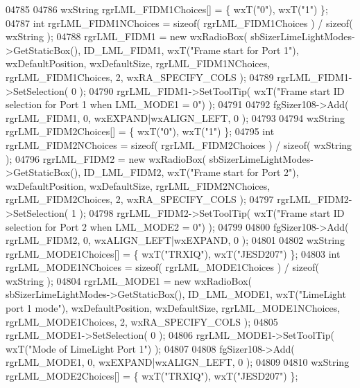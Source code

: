 \begin{DoxyCode}
04785     
04786     wxString rgrLML\_FIDM1Choices[] = \{ wxT(\textcolor{stringliteral}{"0"}), wxT(\textcolor{stringliteral}{"1"}) \};
04787     \textcolor{keywordtype}{int} rgrLML\_FIDM1NChoices = \textcolor{keyword}{sizeof}( rgrLML\_FIDM1Choices ) / \textcolor{keyword}{sizeof}( wxString );
04788     rgrLML_FIDM1 = \textcolor{keyword}{new} wxRadioBox( sbSizerLimeLightModes->GetStaticBox(), 
      ID_LML_FIDM1, wxT(\textcolor{stringliteral}{"Frame start for Port 1"}), wxDefaultPosition, wxDefaultSize, rgrLML\_FIDM1NChoices, 
      rgrLML\_FIDM1Choices, 2, wxRA\_SPECIFY\_COLS );
04789     rgrLML_FIDM1->SetSelection( 0 );
04790     rgrLML_FIDM1->SetToolTip( wxT(\textcolor{stringliteral}{"Frame start ID selection for Port 1 when LML\_MODE1 = 0"}) );
04791     
04792     fgSizer108->Add( rgrLML_FIDM1, 0, wxEXPAND|wxALIGN\_LEFT, 0 );
04793     
04794     wxString rgrLML\_FIDM2Choices[] = \{ wxT(\textcolor{stringliteral}{"0"}), wxT(\textcolor{stringliteral}{"1"}) \};
04795     \textcolor{keywordtype}{int} rgrLML\_FIDM2NChoices = \textcolor{keyword}{sizeof}( rgrLML\_FIDM2Choices ) / \textcolor{keyword}{sizeof}( wxString );
04796     rgrLML_FIDM2 = \textcolor{keyword}{new} wxRadioBox( sbSizerLimeLightModes->GetStaticBox(), 
      ID_LML_FIDM2, wxT(\textcolor{stringliteral}{"Frame start for Port 2"}), wxDefaultPosition, wxDefaultSize, rgrLML\_FIDM2NChoices, 
      rgrLML\_FIDM2Choices, 2, wxRA\_SPECIFY\_COLS );
04797     rgrLML_FIDM2->SetSelection( 1 );
04798     rgrLML_FIDM2->SetToolTip( wxT(\textcolor{stringliteral}{"Frame start ID selection for Port 2 when LML\_MODE2 = 0"}) );
04799     
04800     fgSizer108->Add( rgrLML_FIDM2, 0, wxALIGN\_LEFT|wxEXPAND, 0 );
04801     
04802     wxString rgrLML\_MODE1Choices[] = \{ wxT(\textcolor{stringliteral}{"TRXIQ"}), wxT(\textcolor{stringliteral}{"JESD207"}) \};
04803     \textcolor{keywordtype}{int} rgrLML\_MODE1NChoices = \textcolor{keyword}{sizeof}( rgrLML\_MODE1Choices ) / \textcolor{keyword}{sizeof}( wxString );
04804     rgrLML_MODE1 = \textcolor{keyword}{new} wxRadioBox( sbSizerLimeLightModes->GetStaticBox(), 
      ID_LML_MODE1, wxT(\textcolor{stringliteral}{"LimeLight port 1 mode"}), wxDefaultPosition, wxDefaultSize, rgrLML\_MODE1NChoices, 
      rgrLML\_MODE1Choices, 2, wxRA\_SPECIFY\_COLS );
04805     rgrLML_MODE1->SetSelection( 0 );
04806     rgrLML_MODE1->SetToolTip( wxT(\textcolor{stringliteral}{"Mode of LimeLight Port 1"}) );
04807     
04808     fgSizer108->Add( rgrLML_MODE1, 0, wxEXPAND|wxALIGN\_LEFT, 0 );
04809     
04810     wxString rgrLML\_MODE2Choices[] = \{ wxT(\textcolor{stringliteral}{"TRXIQ"}), wxT(\textcolor{stringliteral}{"JESD207"}) \};

\end{DoxyCode}
